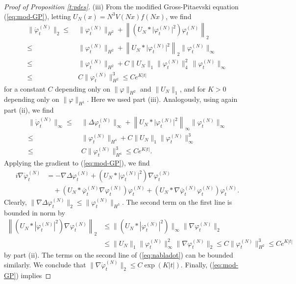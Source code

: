 \documentclass[11pt,a4paper]{article}
\newcommand{\norm}[1]{\lVert#1\rVert}	%
\newcommand{\ph}{\varphi_t^{(N)}}	%
\newcommand{\phdot}{\dot{\varphi}_t^{(N)}}	%
\begin{document}
\begin{proof}[Proof of Proposition \ref{t:pdes}]
(iii) {F}rom the modified Gross-Pitaevski equation (\ref{eq:mod-GP}), letting $U_N (x) = N^3 V(Nx) f(Nx)$, we find
\[ \begin{split}
\norm{\phdot}_{2} \leq \; & \norm{\ph}_{H^2} + \left\| \left(U_N * \lvert \ph\rvert^2 \right)\ph \right\|_2 \\  \leq \; & \norm{\ph}_{H^2} + \left\| U_N * \lvert \ph\rvert^2 \right\|_2 \| \ph \|_\infty \\ \leq \; &
 \norm{\ph}_{H^2} + C \| U_N \|_1 \| \ph \|_4^2 \, \| \ph \|_\infty \\ \leq \;  &C \| \ph \|_{H^2}^3 \leq C e^{K |t|} 
\end{split} \]
for a constant $C$ depending only on $\| \varphi \|_{H^2}$ and $\| U_N \|_1$, and for $K >0$ depending only on $\| \varphi \|_{H^1}$. Here we used part (iii). Analogously, using again part (ii), we find
\[  \begin{split}
\norm{\phdot}_{\infty} \leq \; & \norm{\Delta \ph}_{\infty} + \left\| U_N * \lvert \ph\rvert^2 \right\|_\infty \| \ph \|_\infty \\ \leq \; &
 \norm{\ph}_{H^4} + C \| U_N \|_1 \| \ph \|_\infty^3  \\ \leq \;  &C \| \ph \|_{H^4}^3 \leq C e^{K |t|}. 
\end{split} \]
Applying the gradient to (\ref{eq:mod-GP}), we find 
\begin{equation}\label{eq:nabladot} \begin{split}
i \nabla \phdot & = - \nabla \Delta \ph + \left( U_N \ast \lvert \ph \rvert^2 \right) \nabla \ph \\
& \quad + \left( U_N \ast \overline{\varphi}_t^{(N)} \nabla \ph \right) \ph + \left( U_N \ast  \nabla \overline{\varphi}_t^{(N)} \ph \right) \ph. 
\end{split} \end{equation}
Clearly, $\norm{\nabla \Delta \ph}_{2} \leq \norm{\ph}_{H^3}$. The second term on the first line is bounded in norm by
\[\begin{split}  \left\| (U_N * |\varphi_t^{(N)}|^2) \nabla \ph \right\|_2 & \leq \| (U_N * |\varphi_t^{(N)}|^2)  \|_{\infty}   \| \nabla \ph \|_2 \\ &\leq  \|U_N\|_1 \|\varphi_t^{(N)}\|_\infty^2    \| \nabla \ph \|_2 \leq C \| \ph \|_{H^2}^3 \leq C e^{K|t|} \end{split} \]
by part (ii). The terms on the second line of (\ref{eq:nabladot}) can be bounded similarly. We conclude that $\| \nabla \dot{\varphi}_t^{(N)} \|_2 \leq C \exp (K |t|)$. Finally, (\ref{eq:mod-GP}) implies 

\end{proof}
\end{document}
